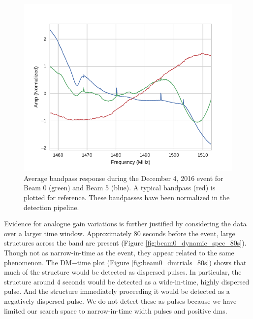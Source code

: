 \documentclass[a4paper,fleqn,usenatbib]{mnras}
\begin{document}
\begin{figure}
    \includegraphics[width=1.0\linewidth]{figures/bandpass_response.pdf}
    \caption{Average bandpass response during the December 4, 2016 event for
    Beam 0 (green) and Beam 5 (blue). A typical bandpass (red) is plotted for
    reference. These bandpasses have been normalized in the detection pipeline.
    }
    \label{fig:bandpass_response}
\end{figure}

Evidence for analogue gain variations is further justified by considering the
data over a larger time window.  Approximately 80 seconds before the event,
large structures across the band are present (Figure
\ref{fig:beam0_dynamic_spec_80s}). Though not as narrow-in-time as the event,
they appear related to the same phenomenon.  The DM$-$time plot (Figure
\ref{fig:beam0_dmtrials_80s}) shows that much of the structure would be detected
as dispersed pulses.  In particular, the structure around 4 seconds would be
detected as a wide-in-time, highly dispersed pulse.  And the structure
immediately proceeding it would be detected as a negatively dispersed pulse.  We
do not detect these as pulses because we have limited our search space to
narrow-in-time width pulses and positive \glspl{dm}.
\end{document}
